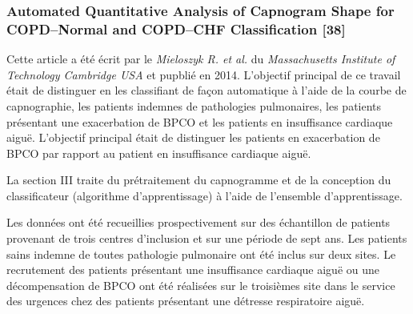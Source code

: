\documentclass[12pt,]{article}
\begin{document}
\subsubsection{\texorpdfstring{Automated Quantitative Analysis of
Capnogram Shape for COPD--Normal and COPD--CHF Classification
{[}38{]}}{Automated Quantitative Analysis of Capnogram Shape for COPD--Normal and COPD--CHF Classification ,{[}38{]}}}\label{automated-quantitative-analysis-of-capnogram-shape-for-copdnormal-and-copdchf-classification-mieloszyk2014automated}

Cette article a été écrit par le \emph{Mieloszyk R. et al.} du
\emph{Massachusetts Institute of Technology Cambridge USA} et pupblié en
2014. L'objectif principal de ce travail était de distinguer en les
classifiant de façon automatique à l'aide de la courbe de capnographie,
les patients indemnes de pathologies pulmonaires, les patients
présentant une exacerbation de BPCO et les patients en insuffisance
cardiaque aiguë. L'objectif principal était de distinguer les patients
en exacerbation de BPCO par rapport au patient en insuffisance cardiaque
aiguë.

La section III traite du prétraitement du capnogramme et de la
conception du classificateur (algorithme d'apprentissage) à l'aide de
l'ensemble d'apprentissage.

Les données ont été recueillies prospectivement sur des échantillon de
patients provenant de trois centres d'inclusion et sur une période de
sept ans. Les patients sains indemne de toutes pathologie pulmonaire ont
été inclus sur deux sites. Le recrutement des patients présentant une
insuffisance cardiaque aiguë ou une décompensation de BPCO ont été
réalisées sur le troisièmes site dans le service des urgences chez des
patients présentant une détresse respiratoire aiguë.
\end{document}
